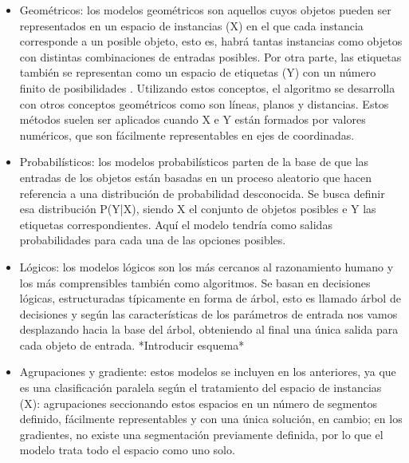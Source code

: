 \begin{itemize}
	\item Geométricos: los modelos geométricos son aquellos cuyos objetos pueden ser representados en un espacio de instancias (X) en el que cada instancia corresponde a un posible objeto, esto es, habrá tantas instancias como objetos con distintas combinaciones de entradas posibles. Por otra parte, las etiquetas también se representan como un espacio de etiquetas (Y) con un número finito de posibilidades \citep{MLPref}. Utilizando estos conceptos, el algoritmo se desarrolla con otros conceptos geométricos como son líneas, planos y distancias. Estos métodos suelen ser aplicados cuando X e Y están formados por valores numéricos, que son fácilmente representables en ejes de coordinadas.
	\item Probabilísticos: los modelos probabilísticos parten de la base de que las entradas de los objetos están basadas en un proceso aleatorio que hacen referencia a una distribución de probabilidad desconocida. Se busca definir esa distribución P(Y|X), siendo X el conjunto de objetos posibles e Y las etiquetas correspondientes. Aquí el modelo tendría como salidas probabilidades para cada una de las opciones posibles. 
	\item Lógicos: los modelos lógicos son los más cercanos al razonamiento humano y los más comprensibles también como algoritmos. Se basan en decisiones lógicas, estructuradas típicamente en forma de árbol, esto es llamado árbol de decisiones y según las características de los parámetros de entrada nos vamos desplazando hacia la base del árbol, obteniendo al final una única salida para cada objeto de entrada. *Introducir esquema*
	\item Agrupaciones y gradiente: estos modelos se incluyen en los anteriores, ya que es una clasificación paralela según el tratamiento del espacio de instancias (X): agrupaciones seccionando estos espacios en un número de segmentos definido, fácilmente representables y con una única solución, en cambio; en los gradientes, no existe una segmentación previamente definida, por lo que el modelo trata todo el espacio como uno solo. 
\end{itemize}

